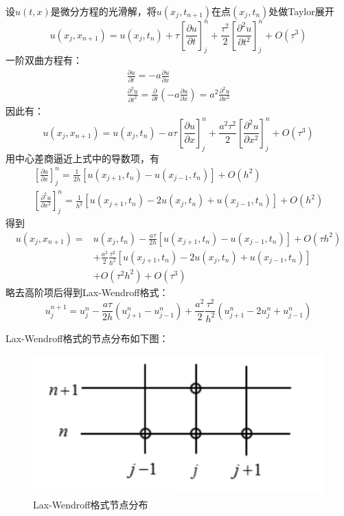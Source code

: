 \documentclass[fontset=mac]{ctexart}
\begin{document}
	设$u(t,x)$是微分方程的光滑解，将$u(x_j,t_{n+1})$在点$(x_j,t_n)$处做Taylor展开
	$$
	u\left(x_{j}, x_{n+1}\right)=u\left(x_{j}, t_{n}\right)+\tau\left[\frac{\partial u}{\partial t}\right]_{j}^{n}+\frac{\tau^{2}}{2}\left[\frac{\partial^{2} u}{\partial t^{2}}\right]_{j}^{n}+O\left(\tau^{3}\right)
	$$
	一阶双曲方程有：
	$$
	\begin{array}{c}
		\frac{\partial u}{\partial t}=-a \frac{\partial u}{\partial x} \\
		\frac{\partial^{2} u}{\partial t^{2}}=\frac{\partial}{\partial t}\left(-a \frac{\partial u}{\partial x}\right)=a^{2} \frac{\partial^{2} u}{\partial x^{2}}
	\end{array}
	$$
	因此有：
	$$
	u\left(x_{j}, x_{n+1}\right)=u\left(x_{j}, t_{n}\right)-a \tau\left[\frac{\partial u}{\partial x}\right]_{j}^{n}+\frac{a^{2} \tau^{2}}{2}\left[\frac{\partial^{2} u}{\partial x^{2}}\right]_{j}^{n}+O\left(\tau^{3}\right)
	$$
	用中心差商逼近上式中的导数项，有
	$$
	\begin{array}{l}
		{\left[\frac{\partial u}{\partial x}\right]_{j}^{n}=\frac{1}{2 h}\left[u\left(x_{j+1}, t_{n}\right)-u\left(x_{j-1}, t_{n}\right)\right]+O\left(h^{2}\right)} \\
		{\left[\frac{\partial^{2} u}{\partial x^{2}}\right]_{j}^{n}=\frac{1}{h^{2}}\left[u\left(x_{j+1}, t_{n}\right)-2 u\left(x_{j}, t_{n}\right)+u\left(x_{j-1}, t_{n}\right)\right]+O\left(h^{2}\right)}
	\end{array}
	$$
	得到
	$$
	\begin{aligned}
		u\left(x_{j}, x_{n+1}\right)=& u\left(x_{j}, t_{n}\right)-\frac{a \tau}{2 h}\left[u\left(x_{j+1}, t_{n}\right)-u\left(x_{j-1}, t_{n}\right)\right]+O\left(\tau h^{2}\right) \\
		&+\frac{a^{2}}{2} \frac{\tau^{2}}{h^{2}}\left[u\left(x_{j+1}, t_{n}\right)-2 u\left(x_{j}, t_{n}\right)+u\left(x_{j-1}, t_{n}\right)\right] \\
		&+O\left(\tau^{2} h^{2}\right)+O\left(\tau^{3}\right)
	\end{aligned}
	$$
	略去高阶项后得到Lax-Wendroff格式：
	$$
	u_{j}^{n+1}=u_{j}^{n}-\frac{a \tau}{2 h}\left(u_{j+1}^{n}-u_{j-1}^{n}\right)+\frac{a^{2}}{2} \frac{\tau^{2}}{h^{2}}\left(u_{j+1}^{n}-2 u_{j}^{n}+u_{j-1}^{n}\right)
	$$
	
	Lax-Wendroff格式的节点分布如下图：
	\begin{figure}[H]
		\centering
		\includegraphics[width=0.7\linewidth]{fig/fig8}
		\caption{Lax-Wendroff格式节点分布}
	\end{figure}
\end{document}
